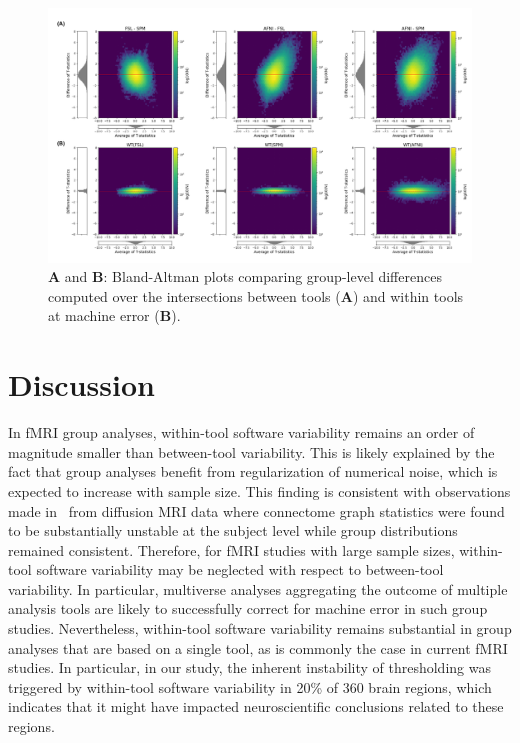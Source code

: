 \begin{figure}[ht]
  \centering
    \includegraphics[width=.9\textwidth]{chapters/chapter3/figures/unthresh-gl-frame-fixedmask.png}
  \caption{\textbf{A} and \textbf{B}: Bland-Altman plots comparing group-level differences computed over the intersections 
  between tools (\textbf{A}) and within tools at machine error (\textbf{B}).}%
  \label{fig:unthresh-maps-mask}
\end{figure}

\section{Discussion}

In fMRI group analyses, within-tool software variability remains an order
of magnitude smaller than between-tool variability. This is likely
explained by the fact that group analyses benefit from regularization of
numerical noise, which is expected to increase with sample size. This finding is
consistent with observations made in~\cite{kiar2020numerical} from
diffusion MRI data where connectome graph statistics were found to be
substantially unstable at the subject level while group distributions
remained consistent. Therefore,
for fMRI studies with large sample sizes, within-tool software variability
may be neglected with respect to between-tool variability. In particular,
multiverse analyses aggregating the outcome of multiple analysis tools are
likely to successfully correct for machine error in such group studies.  Nevertheless, within-tool software variability remains
substantial in group analyses that are based on a single tool, as is
commonly the case in current fMRI studies. In particular, in our study, the
inherent instability of thresholding was triggered by within-tool software
variability in 20\% of 360 brain regions, which indicates that it might have
impacted neuroscientific conclusions related to these regions.


